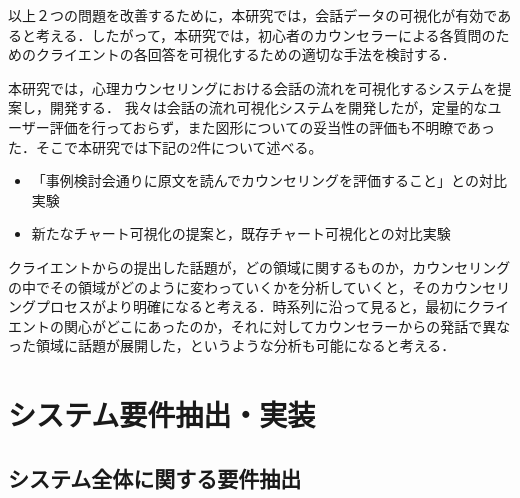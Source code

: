 \documentclass[shuuron]{kuee}
\begin{document}

以上２つの問題を改善するために，本研究では，会話データの可視化が有効であると考える．したがって，本研究では，初心者のカウンセラーによる各質問のためのクライエントの各回答を可視化するための適切な手法を検討する．

本研究では，心理カウンセリングにおける会話の流れを可視化するシステムを提案し，開発する．
我々\cite{uetsuji}は会話の流れ可視化システムを開発したが，定量的なユーザー評価を行っておらず，また図形についての妥当性の評価も不明瞭であった．そこで本研究では下記の2件について述べる。
\begin{itemize}
  \item 「事例検討会通りに原文を読んでカウンセリングを評価すること」との対比実験
  \item 新たなチャート可視化の提案と，既存チャート可視化との対比実験
\end{itemize}

クライエントからの提出した話題が，どの領域に関するものか，カウンセリングの中でその領域がどのように変わっていくかを分析していくと，そのカウンセリングプロセスがより明確になると考える．時系列に沿って見ると，最初にクライエントの関心がどこにあったのか，それに対してカウンセラーからの発話で異なった領域に話題が展開した，というような分析も可能になると考える．




\section{システム要件抽出・実装}

\subsection{システム全体に関する要件抽出}
\end{document}
